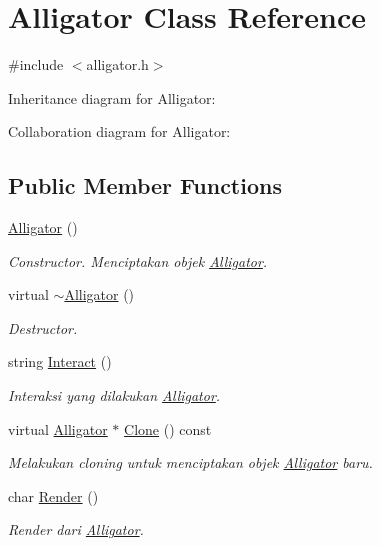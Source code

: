 \hypertarget{classAlligator}{}\section{Alligator Class Reference}
\label{classAlligator}


{\ttfamily \#include $<$alligator.\+h$>$}



Inheritance diagram for Alligator\+:


Collaboration diagram for Alligator\+:
\subsection*{Public Member Functions}
\begin{DoxyCompactItemize}
\item 
\hyperlink{classAlligator_af1f21eea8d991b0ceb892448f456e587}{Alligator} ()
\begin{DoxyCompactList}\small\item\em Constructor. Menciptakan objek \hyperlink{classAlligator}{Alligator}. \end{DoxyCompactList}\item 
virtual \hyperlink{classAlligator_a9504f449fe1f01c94c0052f994340b14}{$\sim$\+Alligator} ()
\begin{DoxyCompactList}\small\item\em Destructor. \end{DoxyCompactList}\item 
string \hyperlink{classAlligator_a8f6141caa973d33f2066c3561cd817b3}{Interact} ()
\begin{DoxyCompactList}\small\item\em Interaksi yang dilakukan \hyperlink{classAlligator}{Alligator}. \end{DoxyCompactList}\item 
virtual \hyperlink{classAlligator}{Alligator} $\ast$ \hyperlink{classAlligator_aa317f0d37332919f638128c41cd7b53f}{Clone} () const 
\begin{DoxyCompactList}\small\item\em Melakukan cloning untuk menciptakan objek \hyperlink{classAlligator}{Alligator} baru. \end{DoxyCompactList}\item 
char \hyperlink{classAlligator_aa8f0a207888bf7f682ebc6b57270dd33}{Render} ()
\begin{DoxyCompactList}\small\item\em Render dari \hyperlink{classAlligator}{Alligator}. \end{DoxyCompactList}\end{DoxyCompactItemize}
